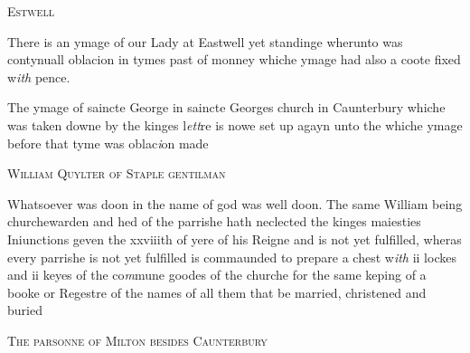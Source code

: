 \documentclass[12pt, a4paper]{book}
\begin{document}
 
	
           
               
				\begin{center} \begin{large} {\scshape Estwell} \end{large} \end{center}
			
		
			
				\marginpar[\vspace{0.5cm}{\textcolor{Gray}{Images}}]{}
			
			
		\ifthenelse{\isodd{\thepage}}
		{\reversemarginpar}
		{\normalmarginpar}
		There is an ymage of our Lady at Eastwell yet standinge wherunto was
		 contynuall oblacion in tymes past of monney whiche ymage had also a
		 coote fixed w\textit{ith} pence.
			
		\ifthenelse{\isodd{\thepage}}
		{\reversemarginpar}
		{\normalmarginpar}
		The ymage of saincte George in saincte Georges church in Caunterbury
		 whiche was taken downe by the kinges l\textit{ett}re is nowe set up agayn
		 unto the whiche ymage before that tyme was oblac\textit{i}on made
		
	
            
               
				\begin{center} \begin{large} {\scshape William Quylter of Staple gentilman} \end{large} \end{center}
			

		 
		 	
				\marginpar[\vspace{0.5cm}{\textcolor{Gray}{Injunctions n}}]{}
			
		 	
		\ifthenelse{\isodd{\thepage}}
		{\reversemarginpar}
		{\normalmarginpar}
		Whatsoever was doon in the name of god was well doon.
		 The same William being churchewarden and hed of the parrishe hath
		 neclected the kinges maiesties Iniunctions geven the xxviiith of yere
		 of his Reigne and is not yet fulfilled, wheras every parrishe is
		 not yet fulfilled is commaunded to prepare a chest w\textit{ith} ii lockes
		 and ii keyes of the co\textit{m}mune goodes of the churche for the same keping
		 of a booke or Regestre of the names of all them that be married,
		 christened and buried
		 
	
            
            	
				\begin{center} \begin{large} {\scshape The parsonne of Milton besides Caunterbury} \end{large} \end{center}
			
\end{document}
